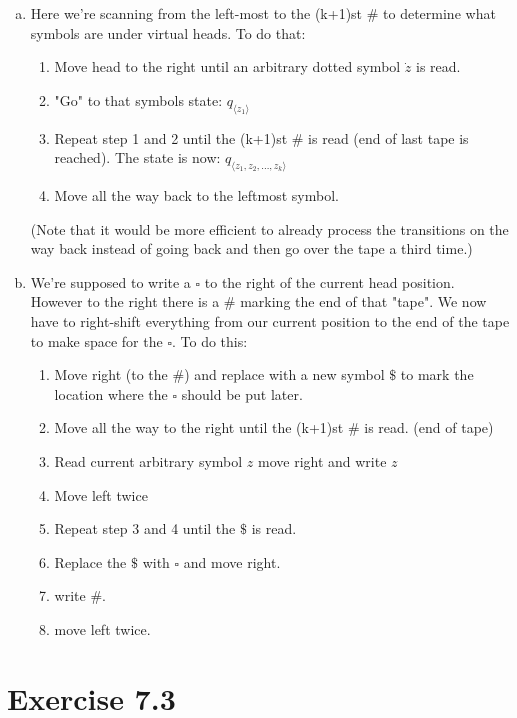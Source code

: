 \documentclass{article} %
\newcommand{\homeworkNumber}{7}
\begin{document}
\begin{enumerate}[(a)]
\item
Here we're scanning from the left-most to the (k+1)st $\#$ to determine what symbols are under virtual heads. To do that:
\begin{enumerate}[1.]
\item Move head to the right until an arbitrary dotted symbol $\dot{z}$ is read.
\item "Go" to that symbols state: $q_{\langle z_1 \rangle}$
\item Repeat step 1 and 2 until the (k+1)st $\#$ is read (end of last tape is reached). The state is now: $q_{\langle z_1, z_2, \dots, z_k \rangle}$
\item Move all the way back to the leftmost symbol.
\end{enumerate}
(Note that it would be more efficient to already process the transitions on the way back instead of going back and then go over the tape a third time.)
\clearpage
\item
We're supposed to write a $\square$ to the right of the current head position. However to the right there is a $\#$ marking the end of that "tape". We now have to right-shift everything from our current position to the end of the tape to make space for the $\square$. To do this:
\begin{enumerate}[1.]
\item Move right (to the $\#$) and replace with a new symbol $\$$ to mark the location where the $\square$ should be put later.
\item Move all the way to the right until the (k+1)st $\#$ is read. (end of tape)
\item Read current arbitrary symbol $z$ move right and write $z$
\item Move left twice
\item Repeat step 3 and 4 until the $\$$ is read.
\item Replace the $\$$ with $\square$ and move right.
\item write $\#$.
\item move left twice.
\end{enumerate}

\end{enumerate}


\section*{Exercise \homeworkNumber.3}
\end{document}
